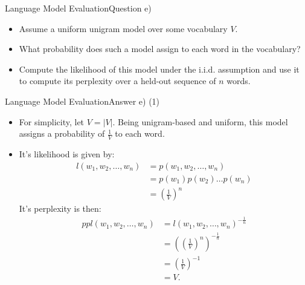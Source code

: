 \documentclass[t]{beamer}
\begin{document}
\begin{frame}{Language Model Evaluation}{Question e)}
    \begin{itemize}
        \item Assume a uniform unigram model over some vocabulary $V$.
        \item What probability does such a model assign to each word in the
              vocabulary?
        \item Compute the likelihood of this model under the i.i.d. assumption
              and use it to compute its perplexity over a held-out sequence of 
              $n$ words.
    \end{itemize}
\end{frame}

\begin{frame}{Language Model Evaluation}{Answer e) (1)}
    \begin{itemize}
        \item For simplicity, let $V = |V|$.
              Being unigram-based and uniform, this model assigns a probability
              of $\frac{1}{V}$ to each word.
        \item It's likelihood is given by:
              \begin{align*}
                  l(w_1,w_2,\ldots,w_n) & = p(w_1,w_2, \ldots, w_n)     \\
                                        & = p(w_1) p(w_2) \ldots p(w_n) \\
                                        & = \left(\frac{1}{V}\right)^n
              \end{align*}
              It's perplexity is then:
              \begin{align*}
                  ppl(w_1,w_2,\ldots,w_n) & = l(w_1,w_2,\ldots,w_n)^{-\frac{1}{n}}                   \\
                                          & = \left(\left(\frac{1}{V}\right)^n\right)^{-\frac{1}{n}} \\
                                          & = \left(\frac{1}{V}\right)^{-1}                          \\
                                          & = V.
              \end{align*}
    \end{itemize}
\end{frame}
\end{document}
